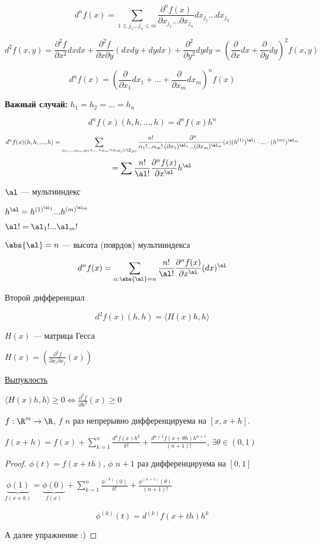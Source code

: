 \[
    d^n  f(x) = \sum_{1 \leqslant j_1 ... j_n \leqslant m} \frac{\partial ^ n f(x)}{\partial x_{j_1} ... \partial x_{j_n}} d x_{j_1} ... dx_{j_n}
\]

\[
    d ^ 2 f(x, y) = \frac{\partial ^ 2 f}{\partial x ^ 2} dx dx + \frac{\partial^2 f}{\partial x \partial y }(dx dy + dy dx) + \frac{\partial ^ 2 }{\partial y ^ 2}  dy dy =
    \left (\frac{\partial}{\partial x} dx + \frac{\partial }{\partial y} dy \right) ^ 2 f(x, y)
\]

\[
    d^n f(x) = \left( \frac{\partial}{\partial x_1} dx_1 + ... + \frac{\partial}{\partial x_m} dx_m  \right) ^ n f(x)
\]

\quad

\textbf{Важный случай:}  $h_1 = h_2 = ... = h_n$

\[
    d ^ n f(x) (h, h, ..., h) = d ^ n f(x) h ^ n
\]

\[
    d ^ n f(x) (h, h, ..., h) = \sum_{\alpha_1, ..., \alpha_m, \alpha_1 + ... + \alpha_m = n, \alpha_j \in \Z_{\geqslant 0}} \frac{n !}{\alpha_1 ! ... \alpha_m !}
     \frac{\partial ^ n}{(\partial x_1) ^ {\al_1} ... (\partial x_m) ^ {\al_m}} (x) (h ^ {(1)}) ^ {\al_1} \cdot ... \cdot (h ^ {(m)}) ^ {\al_m}
\]
\[     
     = \sum \frac{n !}{\al !} \frac{\partial ^ n f(x)}{\partial x ^ \al} h ^ \al
\]

$\al$ --- мультииндекс

$h^\al = h^{(1)^{\al_1}} ... h^{(m)^{\al_m}}$

$\al ! = \al_1 ! ... \al_m !$

$\abs{\al} = n$ --- высота (поярдок) мультииндекса

\[
    d ^ n f(x) = \sum_{\alpha : \abs{\al} = n}
    \frac{n !}{\al !} \frac{\partial ^ n f(x)}{\partial x ^ \al} (dx) ^ \al
\]

Второй дифференциал

\[
    d ^ 2 f(x) (h, h) = \langle H(x) h, h \rangle
\]

$H(x)$ --- матрица Гесса 

$H(x) = (\frac{\partial ^ 2 f}{\partial x_i \partial x_j}(x))$

\underline{Выпуклость}

$\langle H(x) h, h \rangle \geqslant 0 \Longleftrightarrow \frac{\partial ^2 f}{\partial h^2}(x) \geqslant 0$

\begin{theorem}
    $f : \R ^ m \to \R$, $f$ $n$ раз непрерывно дифференцируема на $[x, x + h]$.

    $f(x + h) = f(x) + \sum_{k = 1} ^ n \frac{d ^ k f(x) h ^ k}{k !} + \frac{d ^ {n + 1} f(x + \theta h) h ^ {n + 1}}{(n + 1)!}$, $\exists \theta \in (0, 1)$
\end{theorem}

\begin{proof}
    $\phi(t) = f(x + th)$, $\phi$ $n + 1$ раз дифференцируема на $[0, 1]$

    $\underbrace{\phi(1)}_{f(x + h)} = \underbrace{\phi(0)}_{f(x)} + \sum_{k = 1} ^ n \frac{\phi^{(k)} (0)}{k !} + \frac{\phi^{(n + 1)}(\theta)}{(n + 1)!}$


    \[
        \phi^{(k)}(t) = d^{(k)} f(x + th) h ^ k
    \]

    А далее упражнение :)
\end{proof}
